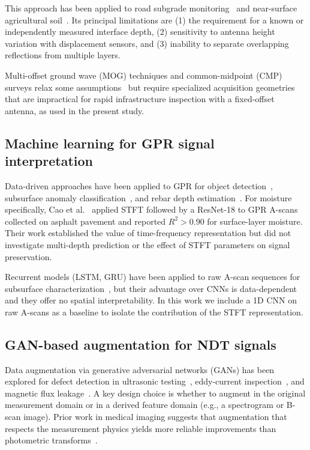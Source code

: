 \documentclass[review]{elsarticle}
\begin{document}
This approach has been applied to road subgrade monitoring~\cite{Benedetto2013,Shangguan2015} and near-surface agricultural soil~\cite{Huisman2003}. Its principal limitations are (1) the requirement for a known or independently measured interface depth, (2) sensitivity to antenna height variation with displacement sensors, and (3) inability to separate overlapping reflections from multiple layers.

Multi-offset ground wave (MOG) techniques and common-midpoint (CMP) surveys relax some assumptions~\cite{Lambot2008} but require specialized acquisition geometries that are impractical for rapid infrastructure inspection with a fixed-offset antenna, as used in the present study.

\subsection{Machine learning for GPR signal interpretation}

Data-driven approaches have been applied to GPR for object detection~\cite{Lameri2017,Giannakis2019}, subsurface anomaly classification~\cite{Pasolli2009}, and rebar depth estimation~\cite{Dinh2021}. For moisture specifically, Cao et al.~\cite{Cao2022} applied STFT followed by a ResNet-18 to GPR A-scans collected on asphalt pavement and reported $R^2 > 0.90$ for surface-layer moisture. Their work established the value of time-frequency representation but did not investigate multi-depth prediction or the effect of STFT parameters on signal preservation.

Recurrent models (LSTM, GRU) have been applied to raw A-scan sequences for subsurface characterization~\cite{Ren2021}, but their advantage over CNNs is data-dependent and they offer no spatial interpretability. In this work we include a 1D CNN on raw A-scans as a baseline to isolate the contribution of the STFT representation.

\subsection{GAN-based augmentation for NDT signals}

Data augmentation via generative adversarial networks (GANs) has been explored for defect detection in ultrasonic testing~\cite{Meng2020}, eddy-current inspection~\cite{Posilovic2021}, and magnetic flux leakage~\cite{Decker2020}. A key design choice is whether to augment in the original measurement domain or in a derived feature domain (e.g., a spectrogram or B-scan image). Prior work in medical imaging suggests that augmentation that respects the measurement physics yields more reliable improvements than photometric transforms~\cite{Shorten2019}.
\end{document}
